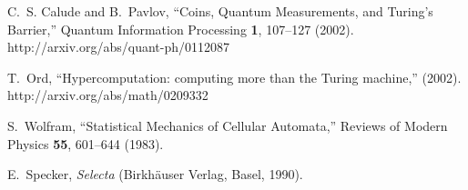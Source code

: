 \documentclass[pre,amssymb,showpacs,showkeys,preprint]{revtex4}
\begin{document}
\begin{thebibliography}{10}
C.~S. Calude and B.~Pavlov, \enquote{Coins, Quantum Measurements, and
  {T}uring's Barrier,} Quantum Information Processing {\bf 1}, 107--127 (2002).
\newline http://arxiv.org/abs/quant-ph/0112087

T.~Ord, \enquote{Hypercomputation: computing more than the Turing machine,}
  (2002).
\newline http://arxiv.org/abs/math/0209332

S.~Wolfram, \enquote{Statistical Mechanics of Cellular Automata,} Reviews of
  Modern Physics {\bf 55}, 601--644 (1983).

E.~Specker, {\em Selecta\/} (Birkh{\"{a}}user Verlag, Basel, 1990).

\end{thebibliography}
\end{document}

